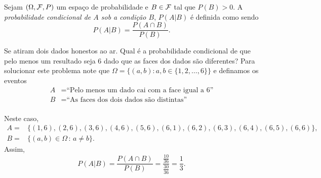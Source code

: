 \begin{frame}
\begin{defi}
Sejam $(\Omega , {\cal F},P)$ um espaço de probabilidade e $B \in {\cal F}$
tal que  $P(B)>0$. A \textit{probabilidade condicional de $A$ sob a condição $B$}, $P(A|B)$ é definida como sendo
$$P(A|B)=\frac{P(A \cap B)}{P(B)}.$$
\end{defi}

\begin{exem}
Se atiram dois dados honestos ao ar. Qual é a probabilidade condicional de que pelo menos um resultado seja 6 dado que as faces dos dados são diferentes? Para solucionar este problema note que $\Omega =\{(a,b):a,b\in \{1,2,\ldots ,6\}\}$ e definamos os eventos 
$$
\begin{aligned}
A &=\text{``Pelo menos um dado cai com a face igual a 6''} \\
B &=\text{``As faces dos dois dados são distintas''} \\
\end{aligned}
$$

Neste caso, 
$$
\begin{aligned}
A = &\{(1,6),(2,6),(3,6),(4,6),(5,6),(6,1),(6,2),(6,3),(6,4), (6,5),(6,6)\}, \\ 
B = &\{(a,b) \in \Omega\,:\,a  \neq  b\}.
\end{aligned}
$$
Assim,  $$P(A|B)=\frac{P(A\cap B)}{P(B)}=\frac{\frac{10}{36}}{\frac{30}{36}}= \frac{1}{3}.$$
\end{exem}

 
\end{frame}


